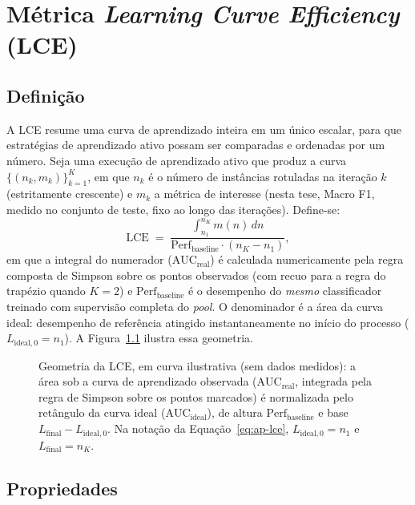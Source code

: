 \chapter{Métrica \texorpdfstring{\textit{Learning Curve Efficiency}}{Learning Curve Efficiency} (LCE)}
\label{ap:lce}

\section{Definição}

A LCE resume uma curva de aprendizado inteira em um único escalar, para que
estratégias de aprendizado ativo possam ser comparadas e ordenadas por um
número. Seja uma execução de aprendizado ativo que produz a curva
$\{(n_k, m_k)\}_{k=1}^{K}$, em que $n_k$ é o número de instâncias rotuladas na
iteração $k$ (estritamente crescente) e $m_k$ a métrica de interesse (nesta
tese, Macro F1, medido no conjunto de teste, fixo ao longo das iterações).
Define-se:
\begin{equation}
\mathrm{LCE} \;=\;
\frac{\displaystyle \int_{n_1}^{n_K} m(n)\, dn}
     {\mathrm{Perf}_{\mathrm{baseline}} \cdot (n_K - n_1)},
\label{eq:ap-lce}
\end{equation}
em que a integral do numerador ($\mathrm{AUC}_{\mathrm{real}}$) é calculada
numericamente pela regra composta de Simpson sobre os pontos observados (com
recuo para a regra do trapézio quando $K=2$) e
$\mathrm{Perf}_{\mathrm{baseline}}$ é o desempenho do \emph{mesmo} classificador
treinado com supervisão completa do \textit{pool}. O denominador é a área da curva
ideal: desempenho de referência atingido instantaneamente no início do
processo ($L_{\mathrm{ideal},0} = n_1$). A Figura~\ref{fig:ap-lce-geometria}
ilustra essa geometria.

\begin{figure}[htbp]
    \centering
    
    \caption{Geometria da LCE, em curva ilustrativa (sem dados medidos): a
    área sob a curva de aprendizado observada ($\mathrm{AUC}_{\mathrm{real}}$,
    integrada pela regra de Simpson sobre os pontos marcados) é normalizada
    pelo retângulo da curva ideal ($\mathrm{AUC}_{\mathrm{ideal}}$), de
    altura $\mathrm{Perf}_{\mathrm{baseline}}$ e base
    $L_{\mathrm{final}}-L_{\mathrm{ideal},0}$. Na notação da
    Equação~\ref{eq:ap-lce}, $L_{\mathrm{ideal},0}=n_1$ e
    $L_{\mathrm{final}}=n_K$.}
    \label{fig:ap-lce-geometria}
\end{figure}

\section{Propriedades}

